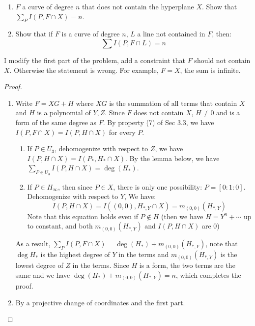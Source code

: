 \documentclass{solution}
\begin{document}
\begin{problem}{5.12}
    \begin{enumerate}
        \item $F$ a curve of degree $n$ that does not contain the hyperplane $X$. Show that $\sum\limits_{P} I(P, F \cap X) = n$.
        \item Show that if $F$ is a curve of degree $n$, $L$ a line not contained in $F$, then:
        $$\sum I(P, F \cap L) = n$$
    \end{enumerate}
\end{problem}

\begin{remark}
    I modify the first part of the problem, add a constraint that $F$ should not contain $X$. Otherwise the statement is wrong. For example, $F = X$, the sum is infinite.
\end{remark}

\begin{proof}
    \begin{enumerate}
        \item Write $F = XG + H$ where $XG$ is the summation of all terms that contain $X$ and $H$ is a polynomial of $Y, Z$. Since $F$ does not contain $X$, $H \ne 0$ and is a form of the same degree as $F$. By property (7) of Sec 3.3, we have $I(P, F \cap X) = I(P, H \cap X)$ for every $P$.
        \begin{enumerate}
            \item If $P \in U_3$, dehomogenize with respect to $Z$, we have $I(P, H \cap X) = I(P_*, H_{*} \cap X)$. By the lemma below, we have $\sum\limits_{P \in U_3} I(P, H \cap X) = \deg (H_*)$.
            \item If $P \in H_{\infty}$, then since $P \in X$, there is only one possibility: $P = [0:1:0]$. Dehomogenize with respect to $Y$, We have:
            $$I(P, H \cap X) = I((0, 0), H_{*, Y} \cap X) = m_{(0, 0)}(H_{*, Y})$$
            Note that this equation holds even if $P \notin H$ (then we have $H = Y^n + \cdots$ up to constant, and both $m_{(0, 0)}(H_{*, Y})$ and $I(P, H \cap X)$ are $0$)
        \end{enumerate}
        As a result, $\sum\limits_{P} I(P, F \cap X) = \deg (H_*) + m_{(0, 0)} (H_{*, Y})$, note that $\deg H_*$ is the highest degree of $Y$ in the terms and $m_{(0, 0)} (H_{*, Y})$ is the lowest degree of $Z$ in the terms. Since $H$ is a form, the two terms are the same and we have $\deg (H_*) + m_{(0, 0)} (H_{*, Y}) = n$, which completes the proof.
        \item By a projective change of coordinates and the first part.
    \end{enumerate}
\end{proof}
\end{document}
